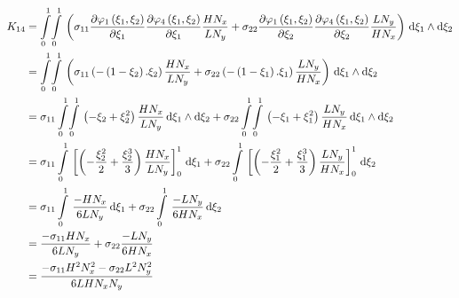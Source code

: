 \begin{equation}
  \begin{aligned}
    K_{14}&=\giint{0}{1}{0}{1}{\pbrac{\sigma_{11}\delby{\lbfn{1}{\xi_{1},\xi_{2}}}{\xi_{1}}\delby{\lbfn{4}{\xi_{1},\xi_{2}}}{\xi_{1}}
        \dfrac{H N_{x}}{L N_{y}}+\sigma_{22}\delby{\lbfn{1}{\xi_{1},\xi_{2}}}{\xi_{2}}\delby{\lbfn{4}{\xi_{1},\xi_{2}}}{\xi_{2}}
        \dfrac{L N_{y}}{H N_{x}}}}{\xi_{1}}{\xi_{2}}\\
    &=\giint{0}{1}{0}{1}{\pbrac{\sigma_{11}\pbrac{-\pbrac{1-\xi_{2}}.\xi_{2}}\dfrac{H N_{x}}{L N_{y}}+
    \sigma_{22}\pbrac{-\pbrac{1-\xi_{1}}.\xi_{1}}\dfrac{L N_{y}}{H N_{x}}}}{\xi_{1}}{\xi_{2}} \\
    &=\sigma_{11}\giint{0}{1}{0}{1}{\pbrac{-\xi_{2}+\xi_{2}^{2}}\dfrac{H N_{x}}{L N_{y}}}{\xi_{1}}{\xi_{2}}+
    \sigma_{22}\giint{0}{1}{0}{1}{\pbrac{-\xi_{1}+\xi_{1}^{2}}\dfrac{L N_{y}}{H N_{x}}}{\xi_{1}}{\xi_{2}} \\
    &=\sigma_{11}\gint{0}{1}{\sqbrac{\pbrac{-\dfrac{\xi_{2}^{2}}{2}+\dfrac{\xi_{2}^{3}}{3}}\dfrac{H N_{x}}{L N_{y}}}_{0}^{1}}{\xi_{1}}+
    \sigma_{22}\gint{0}{1}{\sqbrac{\pbrac{-\dfrac{\xi_{1}^{2}}{2}+\dfrac{\xi_{1}^{3}}{3}}\dfrac{L N_{y}}{H N_{x}}}_{0}^{1}}{\xi_{2}} \\
    &=\sigma_{11}\gint{0}{1}{\dfrac{-H N_{x}}{6 L N_{y}}}{\xi_{1}}+\sigma_{22}\gint{0}{1}{\dfrac{-L N_{y}}{6 H N_{x}}}{\xi_{2}} \\
    &=\dfrac{-\sigma_{11} H N_{x}}{6 L N_{y}}+\sigma_{22}\dfrac{-L N_{y}}{6 H N_{x}} \\
    &=\dfrac{-\sigma_{11}H^{2}N_{x}^{2}-\sigma_{22}L^{2}N_{y}^{2}}{6 L H N_{x} N_{y}}
  \end{aligned}
\end{equation}

